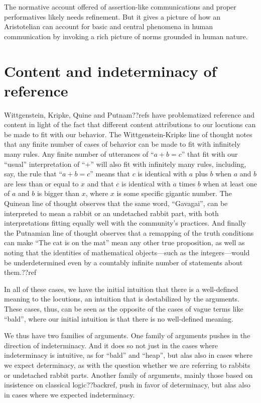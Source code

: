 The normative account offered of assertion-like communications and proper performatives likely needs refinement.
But it gives a picture of how an Aristotelian can account for basic and central phenomena in human communication
by invoking a rich picture of norms grounded in human nature.

\section{Content and indeterminacy of reference}
Wittgenstein, Kripke, Quine and Putnam??refs have problematized reference and content in light of the fact that different
content attributions to our locutions can be made to fit with our behavior. The Wittgenstein-Kripke line of thought notes
that any finite number of cases of behavior can be made to fit with infinitely many rules. Any finite number of utterances
of ``$a+b=c$'' that fit with our ``usual'' interpretation of ``$+$'' will also fit with infinitely many rules, including,
say, the rule that ``$a+b=c$'' means that $c$ is identical with $a$ plus $b$ 
when $a$ and $b$ are less than or equal to $x$ and 
that $c$ is identical with $a$ times $b$ when at least one of $a$ and $b$ is bigger than $x$, where $x$ is some specific gigantic number. The Quinean line of thought observes that the same word, ``Gavagai'',
can be interpreted to mean a rabbit or an undetached rabbit part, with both interpretations fitting equally well with the
community's practices. And finally the Putnamian line of thought observes that a remapping of the truth conditions can make
``The cat is on the mat'' mean any other true proposition, as well as noting that the identities of mathematical objects---such as
the integers---would be underdetermined even by a countably infinite number of statements about them.??ref 

In all of these cases, we have the initial intuition that there is a well-defined meaning to the locutions, an intuition that
is destabilized by the arguments. These cases, thus, can be seen as the opposite of the cases of vague terms like ``bald'', where
our initial intuition is that there is no well-defined meaning.

We thus have two families of arguments. One family of arguments pushes in the direction of indeterminacy. And it does so not
just in the cases where indeterminacy is intuitive, as for ``bald'' and ``heap'', but alas also in cases where we expect determinacy,
as with the question whether we are referring to rabbits or undetached rabbit parts. Another family of arguments, mainly those
based on insistence on classical logic??backref, push in favor of determinacy, but alas also in cases where we expected indeterminacy.

